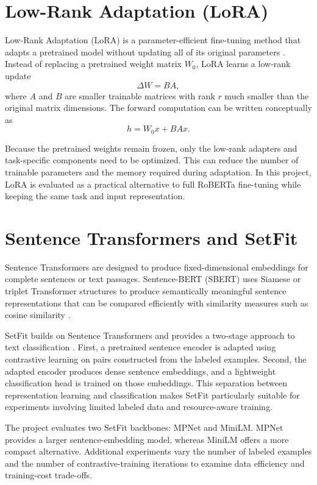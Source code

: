 \section{Low-Rank Adaptation (LoRA)}
Low-Rank Adaptation (LoRA) is a parameter-efficient fine-tuning method that adapts a pretrained model without updating all of its original parameters \cite{hu2021lora}. Instead of replacing a pretrained weight matrix $W_0$, LoRA learns a low-rank update
\begin{equation}
    \Delta W = BA,
\end{equation}
where $A$ and $B$ are smaller trainable matrices with rank $r$ much smaller than the original matrix dimensions. The forward computation can be written conceptually as
\begin{equation}
    h = W_0x + BAx.
\end{equation}

Because the pretrained weights remain frozen, only the low-rank adapters and task-specific components need to be optimized. This can reduce the number of trainable parameters and the memory required during adaptation. In this project, LoRA is evaluated as a practical alternative to full RoBERTa fine-tuning while keeping the same task and input representation.

\section{Sentence Transformers and SetFit}
Sentence Transformers are designed to produce fixed-dimensional embeddings for complete sentences or text passages. Sentence-BERT (SBERT) uses Siamese or triplet Transformer structures to produce semantically meaningful sentence representations that can be compared efficiently with similarity measures such as cosine similarity \cite{reimers2019sentencebert}.

SetFit builds on Sentence Transformers and provides a two-stage approach to text classification \cite{tunstall2022setfit}. First, a pretrained sentence encoder is adapted using contrastive learning on pairs constructed from the labeled examples. Second, the adapted encoder produces dense sentence embeddings, and a lightweight classification head is trained on those embeddings. This separation between representation learning and classification makes SetFit particularly suitable for experiments involving limited labeled data and resource-aware training.

The project evaluates two SetFit backbones: MPNet and MiniLM. MPNet provides a larger sentence-embedding model, whereas MiniLM offers a more compact alternative. Additional experiments vary the number of labeled examples and the number of contrastive-training iterations to examine data efficiency and training-cost trade-offs.

